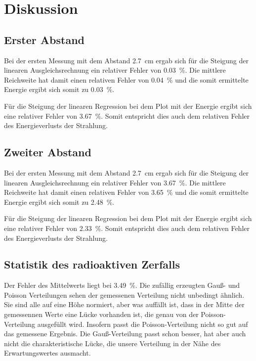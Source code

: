 \section{Diskussion}
\label{sec:Diskussion}

\subsection{Erster Abstand}

Bei der ersten Messung mit dem Abstand \SI{2.7}{\centi\meter} ergab sich für die Steigung der linearen Ausgleichsrechnung ein relativer Fehler von \SI{0.03}{\percent}. Die mittlere Reichweite hat damit einen relativen Fehler von \SI{0.04}{\percent } und die somit ermittelte Energie ergibt sich somit zu \SI{0.03}{\percent}. 

Für die Steigung der linearen Regression bei dem Plot mit der Energie ergibt sich eine relativer Fehler von \SI{3.67}{\percent}. Somit entspricht dies auch dem relativen Fehler des Energieverlusts der Strahlung. 

\subsection{Zweiter Abstand}

Bei der ersten Messung mit dem Abstand \SI{2.7}{\centi\meter} ergab sich für die Steigung der linearen Ausgleichsrechnung ein relativer Fehler von \SI{3.67}{\percent}. Die mittlere Reichweite hat damit einen relativen Fehler von \SI{3.65}{\percent } und die somit ermittelte Energie ergibt sich somit zu \SI{2.48}{\percent}. 

Für die Steigung der linearen Regression bei dem Plot mit der Energie ergibt sich eine relativer Fehler von \SI{2.33}{\percent}. Somit entspricht dies auch dem relativen Fehler des Energieverlusts der Strahlung. 

\subsection{Statistik des radioaktiven Zerfalls}

Der Fehler des Mittelwerts liegt bei \SI{3.49}{\percent}. 
Die zufällig erzeugten Gauß- und Poisson Verteilungen sehen der gemessenen Verteilung nicht unbedingt ähnlich. Sie sind alle auf eine Höhe normiert, aber was auffällt ist, dass in der Mitte der gemessennen Werte eine Lücke vorhanden ist, die genau von der Poisson-Verteilung ausgefüllt wird. Insofern passt die Poisson-Verteilung nicht so gut auf das gemessene Ergebnis. Die Gauß-Verteilung passt schon besser, hat aber auch nicht die charakteristische Lücke, die unsere Verteilung in der Nähe des Erwartungswertes ausmacht. 
